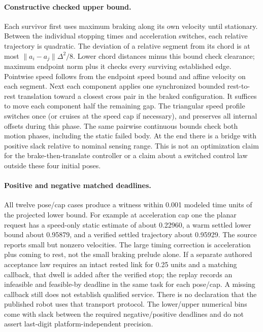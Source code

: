 \documentclass{article}
\begin{document}
\paragraph{Constructive checked upper bound.}
Each survivor first uses maximum braking along its own velocity
until stationary. Between the individual stopping times and
acceleration switches, each relative trajectory is quadratic.
The deviation of a relative segment from its chord is at most
$\|a_i-a_j\|\Delta^2/8$. Lower chord distances minus this bound
check clearance; maximum endpoint norm plus it checks every
surviving established edge. Pointwise speed follows from the
endpoint speed bound and affine velocity on each segment.
Next each component applies one synchronized bounded rest-to-rest
translation toward a closest cross pair in the braked configuration.
It suffices to move each component half the remaining gap.
The triangular speed profile switches once (or cruises at the speed
cap if necessary), and preserves all internal offsets during this
phase. The same pairwise continuous bounds check both motion
phases, including the static failed body. At the end there is a
bridge with positive slack relative to nominal sensing range.
This is not an optimization claim for the brake-then-translate
controller or a claim about a switched control law outside these
four initial poses.

\paragraph{Positive and negative matched deadlines.}
All twelve pose/cap cases produce a witness within 0.001 modeled
time units of the projected lower bound. For example at acceleration
cap one the planar request has a speed-only static estimate
of about 0.22960, a warm settled lower bound about 0.95879, and
a verified settled trajectory about 0.95929. The source reports
small but nonzero velocities. The large timing correction is
acceleration plus coming to rest, not the small braking prelude
alone. If a separate authored acceptance law requires an intact
rested link for 0.25 units and a matching callback, that dwell is
added after the verified stop; the replay records an infeasible and
feasible-by deadline in the same task for each pose/cap. A missing
callback still does not establish qualified service. There is no
declaration that the published robot uses that transport protocol.
The lower/upper numerical bins come with slack between the
required negative/positive deadlines and do not assert
last-digit platform-independent precision.
\end{document}
